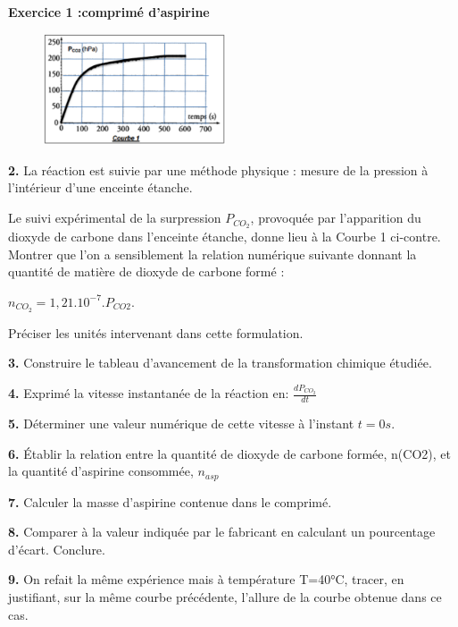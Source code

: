 \documentclass[12pt, french]{article}
\begin{document}
\begin{Box2}{\textbf{Exercice 1 :comprimé d'aspirine}}
\begin{figure}
  \begin{center}
	  \vspace{-1.2cm}
	\includegraphics[width=0.48\textwidth]{./img/ex01_2.png}
  \end{center}
\end{figure}

\textbf{2. }La réaction est suivie par une méthode
physique : mesure de la pression à
l'intérieur d'une enceinte étanche.

Le suivi expérimental de la surpression $P_{CO_2}$,
provoquée par l’apparition du dioxyde de
carbone dans l’enceinte étanche, donne lieu à la
Courbe 1 ci-contre. Montrer que l’on a
sensiblement la relation numérique suivante donnant la quantité de matière de dioxyde de carbone formé :

$n_{CO_2} = 1,21.10^{-7}.P_{CO2}$.

Préciser les unités intervenant dans cette formulation.

\textbf{3. }Construire le tableau d’avancement de la transformation chimique étudiée.

\textbf{4. }Exprimé la vitesse instantanée de la réaction en: $\frac{dP_{CO_2}}{dt}$

\textbf{5. }Déterminer une valeur numérique de cette vitesse à l’instant $t = 0 s$.

\textbf{6. }Établir la relation entre la quantité de dioxyde de carbone formée, n(CO2), et la quantité d'aspirine
consommée, $n_{asp}$

\textbf{7. }Calculer la masse d'aspirine contenue dans le comprimé.

\textbf{8. }Comparer à la valeur indiquée par le fabricant en calculant un pourcentage d’écart. Conclure.

\textbf{9. } On refait la même expérience mais à température T=40°C, tracer, en justifiant, sur la même courbe
précédente, l’allure de la courbe obtenue dans ce cas.

\end{Box2}

\end{document}

